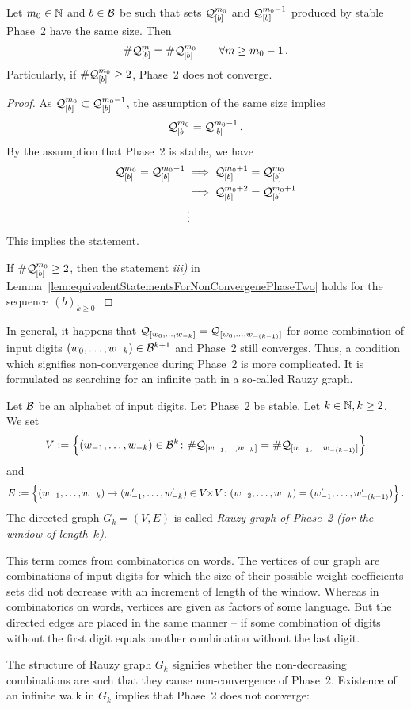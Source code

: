 \begin{thm}
\label{thm:bbbCondition}
Let $m_0 \in \NN$ and $b\in\B$ be such that sets $\Qb{m_0}$ and $\Qb{m_0-1}$ produced by stable Phase~2 have the same size. Then
$$
    \#\Qb{m} = \#\Qb{m_0} \qquad \forall m\geq m_0-1\,.
$$ 
Particularly, if $\#\Qb{m_0}\geq 2$, Phase~2 does not converge.
\end{thm}
\begin{proof}
As $\Qb{m_0} \subset \Qb{m_0-1}$, the assumption of the same size implies
$$
    \Qb{m_0} = \Qb{m_0-1}\,.
$$
By the assumption that Phase~2 is stable, we have
\begin{align*}
 \Qb{m_0} = \Qb{m_0-1} &\implies  \Qb{m_0+1} = \Qb{m_0} \\
 						&\implies  \Qb{m_0+2} = \Qb{m_0+1} \\
 						&\vdots
\end{align*}
This implies the statement.

If $\#\Qb{m_0}\geq 2$, then the statement \textit{iii)} in Lemma~\ref{lem:equivalentStatementsForNonConvergenePhaseTwo} holds for the sequence $(b)_{k\geq 0}$.
\end{proof}

In general, it happens that $\Qwo{k}=\Qwo{(k-1)}$ for some combination of input digits $\tupleo{k}\in\B^{k+1}$ and Phase~2 still converges. Thus, a condition which signifies non-convergence during Phase~2 is more complicated. It is formulated as searching for an infinite path in a so-called Rauzy graph.
\begin{defn}
Let $\B$ be an alphabet of input digits. Let Phase~2 be stable. Let $k\in\NN, k\geq 2$. We set
$$
V:=\left\{\tuple{1}{k}\in\B^k \colon \#\Qw{1}{k}=\#\Qw{1}{(k-1)}\right\}
$$
and
$$
E:=\left\{\tuple{1}{k}\rightarrow\tuple[w']{1}{k}\in V\!\!\times\! V \colon \tuple{2}{k}=\tuple[w']{1}{(k-1)}\right\}.
$$
The directed graph $G_k=(V,E)$ is called \emph{Rauzy graph of Phase~2 (for the window of length~$k$)}.
\end{defn}
 This term comes from combinatorics on words. The vertices of our graph are combinations of input digits for which the size of their possible weight coefficients sets did not decrease with an increment of length of the window. Whereas in combinatorics on words, vertices are given as factors of some language. But the directed edges are placed in the same manner -- if some combination of digits without the first digit equals another combination without the last digit.

The structure of Rauzy graph $G_k$ signifies whether the non-decreasing combinations are such that they cause non-convergence of Phase~2. Existence of an infinite walk in $G_k$ implies that Phase~2 does not converge:

